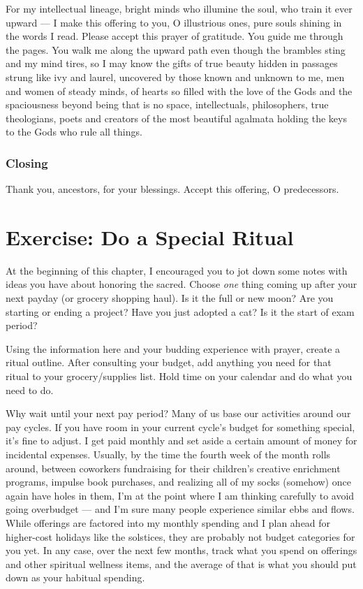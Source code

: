 \documentclass[
]{book}
\begin{document}
For my intellectual lineage,
bright minds who illumine the soul,
who train it ever upward ---
I make this offering to you, O illustrious ones,
pure souls shining in the words I read.
Please accept this prayer of gratitude.
You guide me through the pages.
You walk me along the upward path
even though the brambles sting and my mind tires,
so I may know the gifts of true beauty
hidden in passages strung like ivy and laurel,
uncovered by those known and unknown to me,
men and women of steady minds,
of hearts so filled with the love of the Gods
and the spaciousness beyond being that is no space,
intellectuals, philosophers, true theologians,
poets and creators of the most beautiful agalmata
holding the keys to the Gods who rule all things.

\hypertarget{closing}{%
\subsubsection{Closing}\label{closing}}

Thank you, ancestors, for your blessings. Accept this offering, O predecessors.

\hypertarget{exercise-do-a-special-ritual}{%
\section{Exercise: Do a Special Ritual}\label{exercise-do-a-special-ritual}}

At the beginning of this chapter, I encouraged you to jot down some notes with ideas you have about honoring the sacred. Choose \emph{one} thing coming up after your next payday (or grocery shopping haul). Is it the full or new moon? Are you starting or ending a project? Have you just adopted a cat? Is it the start of exam period?

Using the information here and your budding experience with prayer, create a ritual outline. After consulting your budget, add anything you need for that ritual to your grocery/supplies list. Hold time on your calendar and do what you need to do.

Why wait until your next pay period? Many of us base our activities around our pay cycles. If you have room in your current cycle's budget for something special, it's fine to adjust. I get paid monthly and set aside a certain amount of money for incidental expenses. Usually, by the time the fourth week of the month rolls around, between coworkers fundraising for their children's creative enrichment programs, impulse book purchases, and realizing all of my socks (somehow) once again have holes in them, I'm at the point where I am thinking carefully to avoid going overbudget --- and I'm sure many people experience similar ebbs and flows. While offerings are factored into my monthly spending and I plan ahead for higher-cost holidays like the solstices, they are probably not budget categories for you yet. In any case, over the next few months, track what you spend on offerings and other spiritual wellness items, and the average of that is what you should put down as your habitual spending.
\end{document}
